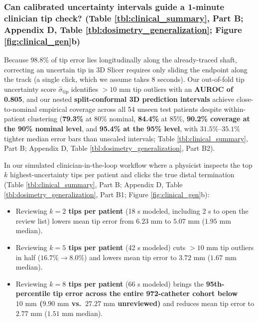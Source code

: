 \documentclass[
  11pt,
]{article}
\providecommand{\tightlist}{%
  \setlength{\itemsep}{0pt}\setlength{\parskip}{0pt}}
\begin{document}
\subsubsection{\texorpdfstring{Can calibrated uncertainty intervals
guide a 1-minute clinician tip check? (Table \ref{tbl:clinical_summary},
Part B; Appendix D, Table \ref{tbl:dosimetry_generalization}; Figure
\ref{fig:clinical_gen}b)}{Can calibrated uncertainty intervals guide a 1-minute clinician tip check? (Table , Part B; Appendix D, Table ; Figure b)}}\label{can-calibrated-uncertainty-intervals-guide-a-1-minute-clinician-tip-check-table-part-b-appendix-d-table-figure-b}

Because 98.8\% of tip error lies longitudinally along the already-traced
shaft, correcting an uncertain tip in 3D Slicer requires only sliding
the endpoint along the track (a single click, which we assume takes 8
seconds). Our out-of-fold tip uncertainty score
\(\hat{\sigma}_{\text{tip}}\) identifies \(>10\text{ mm}\) tip outliers
with an \textbf{AUROC of 0.805}, and our nested \textbf{split-conformal
3D prediction intervals} achieve close-to-nominal empirical coverage
across all 54 unseen test patients despite within-patient clustering
(\textbf{79.3\%} at 80\% nominal, \textbf{84.4\%} at 85\%,
\textbf{90.2\% coverage at the 90\% nominal level}, and \textbf{95.4\%
at the 95\% level}, with \(31.5\%\text{--}35.1\%\) tighter median error
bars than unscaled intervals; Table \ref{tbl:clinical_summary}, Part B;
Appendix D, Table \ref{tbl:dosimetry_generalization}, Part B2).

In our simulated clinician-in-the-loop workflow where a physicist
inspects the top \(k\) highest-uncertainty tips per patient and clicks
the true distal termination (Table \ref{tbl:clinical_summary}, Part B;
Appendix D, Table \ref{tbl:dosimetry_generalization}, Part B1; Figure
\ref{fig:clinical_gen}b):

\begin{itemize}
\tightlist
\item
  Reviewing \textbf{\(k = 2\) tips per patient} (18 s modeled, including
  2 s to open the review list) lowers mean tip error from
  \(6.23\text{ mm}\) to \textbf{\(5.07\text{ mm}\)} (\(1.95\text{ mm}\)
  median).
\item
  Reviewing \textbf{\(k = 5\) tips per patient} (42 s modeled) cuts
  \(>10\text{ mm}\) tip outliers in half (\(16.7\% \to 8.0\%\)) and
  lowers mean tip error to \textbf{\(3.72\text{ mm}\)}
  (\(1.67\text{ mm}\) median).
\item
  Reviewing \textbf{\(k = 8\) tips per patient} (66 s modeled) brings
  the \textbf{95th-percentile tip error across the entire 972-catheter
  cohort below \(10\text{ mm}\) (\(9.90\text{ mm}\)
  vs.~\(27.27\text{ mm}\) unreviewed)} and reduces mean tip error to
  \textbf{\(2.77\text{ mm}\)} (\(1.51\text{ mm}\) median).
\end{itemize}
\end{document}
